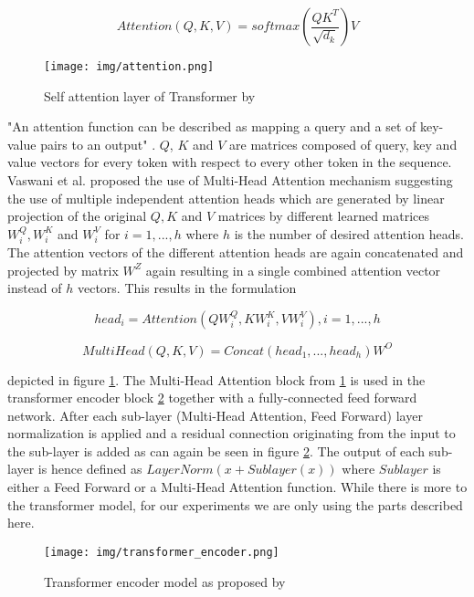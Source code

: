 \begin{equation}
	Attention(Q,K,V) = softmax(\frac{QK^T}{\sqrt{d_k}})V
\end{equation}

\begin{figure}[h]
	\centering
	\texttt{[image: img/attention.png]}
	\caption{Self attention layer of Transformer by \cite{attention_origin}}
	\label{fig:attention}
\end{figure}

"An attention function can be described as mapping a query and a set of key-value pairs to an output" \cite{attention_origin}. $Q$, $K$ and $V$ are matrices composed of query, key and value vectors for every token with respect to every other token in the sequence.
Vaswani et al. proposed the use of Multi-Head Attention mechanism suggesting the use of multiple independent attention heads which are generated by linear projection of the original $Q, K$ and $V$ matrices by different learned matrices $W^Q_i, W^K_i$ and $W^V_i$ for $i = 1, ... ,h$ where $h$ is the number of desired attention heads. The attention vectors of the different attention heads are again concatenated and projected by matrix $W^Z$ again resulting in a single combined attention vector instead of $h$ vectors. This results in the formulation 

\begin{equation}
	head_i = Attention(QW^Q_i, KW^K_i, VW^V_i), i = 1, ..., h
\end{equation}

\begin{equation}
	MultiHead(Q,K,V) = Concat(head_1, ..., head_h)W^O
\end{equation}

depicted in figure \ref{fig:attention}. The Multi-Head Attention block from \ref{fig:attention} is
used in the transformer encoder block \ref{fig:transformer_encoder} together with a fully-connected feed forward network. After each sub-layer (Multi-Head Attention, Feed Forward) layer normalization is applied and a residual connection originating from the input to the sub-layer is added as can again be seen in figure \ref{fig:transformer_encoder}. The output of each sub-layer is hence defined as $LayerNorm(x + Sublayer(x))$ where $Sublayer$ is either a Feed Forward or a Multi-Head Attention function. While there is more to the transformer model, for our experiments we are only using the parts described here.

\begin{figure}[h]
	\centering
	\texttt{[image: img/transformer\_encoder.png]}
	\caption{Transformer encoder model as proposed by \cite{attention_origin}}
	\label{fig:transformer_encoder}
\end{figure}

